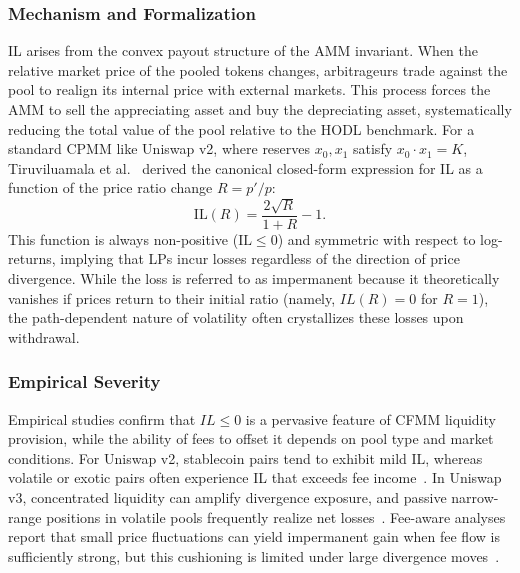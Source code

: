 \documentclass[journal]{IEEEtran}
\begin{document}
\subsubsection{Mechanism and Formalization}
IL arises from the convex payout structure of the AMM invariant. When the relative market price of the pooled tokens changes, arbitrageurs trade against the pool to realign its internal price with external markets. This process forces the AMM to sell the appreciating asset and buy the depreciating asset, systematically reducing the total value of the pool relative to the HODL benchmark.
For a standard CPMM like Uniswap v2, where reserves $x_0, x_1$ satisfy $x_0 \cdot x_1 = K$, Tiruviluamala et al.~\cite{tiruviluamala2022general} derived the canonical closed-form expression for IL as a function of the price ratio change $R = p'/p$:
\begin{equation}
    \mathrm{IL}(R) = \frac{2\sqrt{R}}{1+R} - 1.
    \label{eq:il_canonical}
\end{equation}
This function is always non-positive ($\mathrm{IL} \le 0$) and symmetric with respect to log-returns, implying that LPs incur losses regardless of the direction of price divergence. While the loss is referred to as impermanent because it theoretically vanishes if prices return to their initial ratio (namely, $IL(R)=0$ for $R=1$), the path-dependent nature of volatility often crystallizes these losses upon withdrawal.

\subsubsection{Empirical Severity}
Empirical studies confirm that $IL \le 0$ is a pervasive feature of CFMM liquidity provision, while the ability of fees to offset it depends on pool type and market conditions. 
For Uniswap v2, stablecoin pairs tend to exhibit mild IL, whereas volatile or exotic pairs often experience IL that exceeds fee income~\cite{heimbach2021behavior, boueri2021g3m}. 
In Uniswap v3, concentrated liquidity can amplify divergence exposure, and passive narrow-range positions in volatile pools frequently realize net losses~\cite{heimbach2022risks}. 
Fee-aware analyses report that small price fluctuations can yield impermanent gain when fee flow is sufficiently strong, but this cushioning is limited under large divergence moves~\cite{roman2025impact}.
\end{document}
